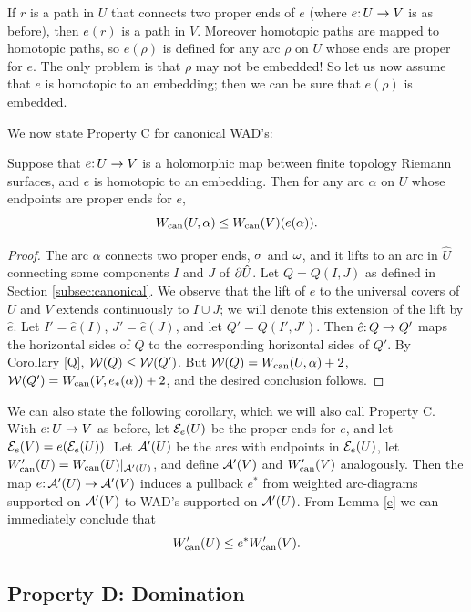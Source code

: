 If $r$ is a path in $U$ that connects two proper ends of $e$ (where $e\from U \to V$ is as before),
then $e(r)$ is a path in $V$. 
Moreover homotopic paths are mapped to homotopic paths,
so $e(\rho)$ is defined for any arc $\rho$ on $U$ whose ends are proper for $e$. 
The only problem is that $\rho$ may not be embedded!
So let us now assume that $e$ is homotopic to an embedding;
then we can be sure that $e(\rho)$ is embedded.

We now state Property C for canonical WAD's:
\begin{lem}\label{e}
Suppose that $e\from U \to V$ is a holomorphic map between finite topology Riemann surfaces, 
and $e$ is homotopic to an embedding. 
Then for any arc $\alpha$ on $U$ whose endpoints are proper ends for $e$,
$$
     W_\can(U, \alpha)  \leq  W_\can(V)(e(\alpha)) .
$$
\end{lem}

\begin{proof}
The arc $\alpha$ connects two proper ends, $\si$ and $\om$,
 and it lifts to an arc in $\hat U$ connecting
some components $I$ and $J$ of $\di \hat U$.
Let $Q = Q(I, J)$  as defined in Section \ref{subsec:canonical}.
We observe that the lift of $e$ to the universal covers of $U$ and $V$ extends continuously to $I \cup J$;
we will denote this extension of the lift by $\hat e$. 
Let $I'=\hat e(I)$, $ J'=\hat e(J)$,
and let $Q' = Q(I', J')$.
Then $\hat e\from Q\ra Q'$ maps the horizontal sides of $Q$ to the corresponding horizontal sides of $Q'$.
By Corollary \ref{Q}, $\WW(Q)\leq \WW(Q')$. But $\WW(Q)= W_\can (U, \alpha)+2$, $\WW(Q')= W_\can (V, e_*(\alpha))+2$,
and the desired conclusion follows.
\end{proof}

We can also state the following corollary,
which we will also call Property C.
With $e\from U\to V$ as before,
let $\EE_e(U)$ be the proper ends for $e$,
and let $\EE_e(V) = e(\EE_e(U))$. 
Let $\AA'(U)$ be the arcs with endpoints in $\EE_e(U)$,
let $\Wcan'(U) = \Wcan(U)|_{\AA'(U)}$,
and define $\AA'(V)$ and $\Wcan'(V)$ analogously.
Then the map $e\from \AA'(U) \to \AA'(V)$ induces a pullback $e^*$ 
from weighted arc-diagrams supported on $\AA'(V)$ to WAD's supported on $\AA'(U)$. 
From Lemma \ref{e} we can immediately conclude that
\begin{equation}
\Wcan'(U) \le e^*\Wcan'(V). 
\end{equation}



\subsection{Property D: Domination}




